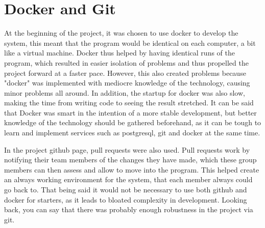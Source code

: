 \section{Docker and Git}
At the beginning of the project, it was chosen to use docker to develop the system, this meant that the program would be identical on each computer, a bit like a virtual machine.
Docker thus helped by having identical runs of the program, which resulted in easier isolation of problems and thus propelled the project forward at a faster pace.
However, this also created problems because "docker" was implemented with mediocre knowledge of the technology, causing minor problems all around.
In addition, the startup for docker was also slow, making the time from writing code to seeing the result stretched.
It can be said that Docker was smart in the intention of a more stable development, but better knowledge of the technology should be gathered beforehand, as it can be tough to learn and implement services such as postgresql, git and docker at the same time.

In the project github page, pull requests were also used. Pull requests work by notifying their team members of the changes they have made, which these group members can then assess and allow to move into the program. This helped create an always working environment for the system, that each member always could go back to.
That being said it would not be necessary to use both github and docker for starters, as it leads to bloated complexity in development. 
Looking back, you can say that there was probably enough robustness in the project via git.